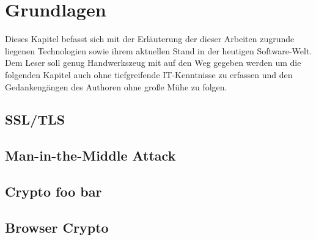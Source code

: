 \section{Grundlagen}

Dieses Kapitel befasst sich mit der Erläuterung der dieser Arbeiten zugrunde liegenen Technologien sowie ihrem aktuellen Stand in der heutigen Software-Welt.
Dem Leser soll genug Handwerkszeug mit auf den Weg gegeben werden um die folgenden Kapitel auch ohne tiefgreifende IT-Kenntnisse zu erfassen und den Gedankengängen des Authoren ohne große Mühe zu folgen.


\subsection{SSL/TLS}
\tbd

\subsection{Man-in-the-Middle Attack}
\tbd

\subsection{Crypto foo bar}
\tbd

\subsection{Browser Crypto}
\tbd
